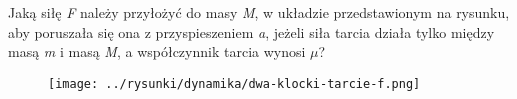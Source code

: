 Jaką siłę \emph{F} należy przyłożyć do masy \emph{M}, w układzie przedstawionym na rysunku, aby poruszała się ona z przyspieszeniem \emph{a}, jeżeli siła tarcia działa tylko między masą \emph{m} i masą \emph{M}, a współczynnik tarcia wynosi \emph{$\mu$}?

\begin{figure}[H]
	\centering
	\texttt{[image: ../rysunki/dynamika/dwa-klocki-tarcie-f.png]}
\end{figure}

